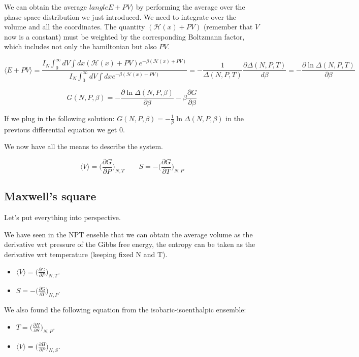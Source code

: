 We can obtain the average $langle E + PV\rangle$ by performing the average over the phase-space distribution we just introduced. We need to integrate over the volume and all the coordinates. The quantity $(\mathcal{H}(x) + PV)$ (remember that $V$ now is a constant) must be weighted by the corresponding Boltzmann factor, which includes not only the hamiltonian but also $PV$.

	$$\langle E + PV\rangle = \frac{I_N\int_0^{\infty} dV\int dx(\mathcal{H}(x) + PV)e^{-\beta(\mathcal{H}(x)+PV)}}{I_N\int_0^{\infty}dV\int dxe^{-\beta(\mathcal{H}(x) + PV)}} = -\frac{1}{\Delta(N, P, T)}\frac{\partial \Delta(N, P, T)}{d\beta} = -\frac{\partial\ln\Delta(N, P, T)}{\partial \beta}$$
	

	$$G(N, P, \beta) = -\frac{\partial\ln\Delta(N, P, \beta)}{\partial\beta}-\beta\frac{\partial G}{\partial \beta}$$

	If we plug in the following solution: $G(N, P, \beta) = -\frac{1}{\beta}\ln\Delta(N, P, \beta)$ in the previous differential equation we get $0$.
	
	We now have all the means to describe the system. 

	$$\langle V\rangle = \biggl(\frac{\partial G}{\partial P}\biggr)_{N, T}\qquad S = -\biggl(\frac{\partial G}{\partial T}\biggr)_{N, P}$$

	\subsection{Maxwell's square}
	
	Let's put everything into perspective. 

	We have seen in the NPT enseble that we can obtain the average volume as the derivative wrt pressure of the Gibbs free energy, the entropy can be taken as the derivative wrt temperature (keeping fixed N and T).
	\begin{multicols}{2}
		\begin{itemize}
			\item $\langle V\rangle = \biggl(\frac{\partial G}{\partial P}\biggr)_{N, T}$.
			\item $S = -\biggl(\frac{\partial G}{\partial T}\biggr)_{N, P}$.
		\end{itemize}
	\end{multicols}
	
	We also found the following equation from the isobaric-isoenthalpic ensemble:

	\begin{multicols}{2}
		\begin{itemize}
			\item $T = \biggl(\frac{\partial H}{\partial S}\biggr)_{N, P}$.
			\item $\langle V\rangle = \biggl(\frac{\partial H}{\partial P}\biggr)_{N, S}$.
		\end{itemize}
	\end{multicols}

